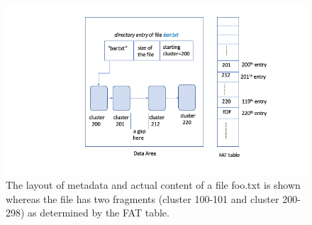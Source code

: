 \begin{paraphrase}
 \begin{figure}[h]
     \centering
     \includegraphics[width=\linewidth]{fig/fat3.png}
     \caption{The layout of metadata and actual content of a file foo.txt is shown whereas the file has two fragments (cluster 100-101 and cluster 200-298) 
 as determined by the FAT table.}
     \label{fig:fat3}
 \end{figure}
\end{paraphrase}



